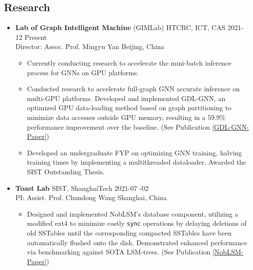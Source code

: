 \documentclass[a4paper,10pt]{ctexart} %
\begin{document}
\begin{keepsection}
\subsection{Research}
\begin{itemize}
    \item \textbf{Lab of Graph Intelligent Machine} (GIMLab) \quad HTCRC, ICT, CAS \hfill 2021-12 \datetlide Present \\
    {\small Director: Assoc. Prof. Mingyu Yan} \hfill Beijing, China
    \begin{small}
        \begin{itemize}
            \item Currently conducting research to accelerate the mini-batch inference process for GNNs on GPU platforms.
            \item Conducted research to accelerate full-graph GNN accurate inference on multi-GPU platforms. Developed and implemented GDL-GNN, an optimized GPU data-loading method based on graph partitioning to minimize data accesses outside GPU memory, resulting in a 59.9\% performance improvement over the baseline. (See Publication \ref{GDL-GNN-Paper})
            \item Developed an undergraduate FYP on optimizing GNN training, halving training times by implementing a multithreaded dataloader. Awarded the SIST Outstanding Thesis.
        \end{itemize}
    \end{small}

    \item \textbf{Toast Lab} \quad SIST, ShanghaiTech \hfill 2021-07 -02 \\
    {\small PI: Assist. Prof. Chundong Wang} \hfill Shanghai, China
    \begin{small}
        \begin{itemize}
            \item Designed and implemented NobLSM's database component, utilizing a modified ext4 to minimize costly \texttt{sync} operations by delaying deletions of old SSTables until the corresponding compacted SSTables have been automatically flushed onto the disk. Demonstrated enhanced performance via benchmarking against SOTA LSM-trees. (See Publication \ref{NobLSM-Paper})
        \end{itemize}
    \end{small}


\end{itemize}
\end{keepsection}
\end{document}
